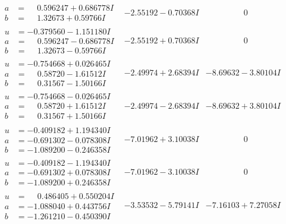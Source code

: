 \documentclass[1p]{elsarticle_modified}
\theoremstyle{definition}
\begin{document}
$$\begin{array}{c|c|c}
\begin{aligned}
a &= \phantom{-}0.596247 + 0.686778 I \\
b &= \phantom{-}1.32673 + 0.59766 I\end{aligned}
 & -2.55192 - 0.70368 I & \phantom{-0.000000 } 0 \\ \hline\begin{aligned}
u &= -0.379560 - 1.151180 I \\
a &= \phantom{-}0.596247 - 0.686778 I \\
b &= \phantom{-}1.32673 - 0.59766 I\end{aligned}
 & -2.55192 + 0.70368 I & \phantom{-0.000000 } 0 \\ \hline\begin{aligned}
u &= -0.754668 + 0.026465 I \\
a &= \phantom{-}0.58720 - 1.61512 I \\
b &= \phantom{-}0.31567 - 1.50166 I\end{aligned}
 & -2.49974 + 2.68394 I & -8.69632 - 3.80104 I \\ \hline\begin{aligned}
u &= -0.754668 - 0.026465 I \\
a &= \phantom{-}0.58720 + 1.61512 I \\
b &= \phantom{-}0.31567 + 1.50166 I\end{aligned}
 & -2.49974 - 2.68394 I & -8.69632 + 3.80104 I \\ \hline\begin{aligned}
u &= -0.409182 + 1.194340 I \\
a &= -0.691302 - 0.078308 I \\
b &= -1.089200 - 0.246358 I\end{aligned}
 & -7.01962 + 3.10038 I & \phantom{-0.000000 } 0 \\ \hline\begin{aligned}
u &= -0.409182 - 1.194340 I \\
a &= -0.691302 + 0.078308 I \\
b &= -1.089200 + 0.246358 I\end{aligned}
 & -7.01962 - 3.10038 I & \phantom{-0.000000 } 0 \\ \hline\begin{aligned}
u &= \phantom{-}0.486405 + 0.550204 I \\
a &= -1.088040 + 0.443756 I \\
b &= -1.261210 - 0.450390 I\end{aligned}
 & -3.53532 - 5.79141 I & -7.16103 + 7.27058 I \\ \hline\begin{aligned}

\end{aligned}
\end{array}$$
\end{document}
